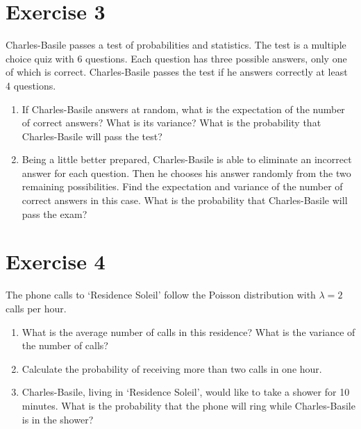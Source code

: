 \documentclass[12pt,thmsa]{article}
\begin{document}
\newpage

\section*{Exercise 3}

Charles-Basile passes a test of probabilities and statistics. The test is a multiple choice quiz with 6 questions. Each question has three possible answers, only one of which is correct. Charles-Basile passes the test if he answers correctly at least 4 questions.


\begin{enumerate}%
\item If Charles-Basile answers at random, what is the expectation of the number of correct answers?
What is its variance? What is the probability that Charles-Basile will pass the test?

\item Being a little better prepared, Charles-Basile is able to eliminate an incorrect answer for each question. Then he chooses his answer randomly from the two remaining possibilities.
Find the expectation and variance of the number of correct answers in this case.
What is the probability that Charles-Basile will pass the exam?

\end{enumerate}





\section*{Exercise 4}

The phone calls to `Residence Soleil' follow the Poisson distribution with $\lambda = 2$ calls per hour.
\begin{enumerate}%
\item What is the average number of calls in this residence? What is the variance of the number of calls?
\item Calculate the probability of receiving more than two calls in one hour.

\item Charles-Basile, living in `Residence Soleil', would like to take a shower for 10 minutes.
What is the probability that the phone will ring while Charles-Basile is in the shower?

\end{enumerate}
\end{document}
